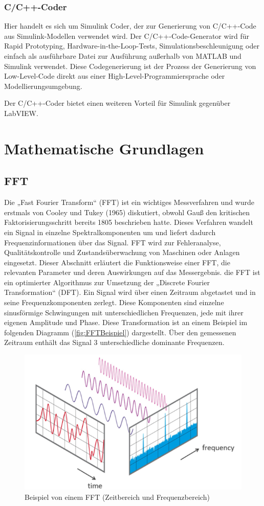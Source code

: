 \subsubsection{C/C++-Coder}
Hier handelt es sich um Simulink Coder, der zur Generierung von C/C++-Code aus Simulink-Modellen verwendet wird. Der C/C++-Code-Generator wird für Rapid Prototyping, Hardware-in-the-Loop-Tests, Simulationsbeschleunigung oder einfach als ausführbare Datei zur Ausführung außerhalb von MATLAB und Simulink verwendet.
Diese Codegenerierung ist der Prozess der Generierung von Low-Level-Code direkt aus einer High-Level-Programmiersprache oder Modellierungsumgebung.

Der C/C++-Coder bietet einen weiteren Vorteil für Simulink gegenüber LabVIEW.
\section{Mathematische Grundlagen}

\subsection{FFT}
\cite{NTIAudioFFT}\cite{WeissteinFFT}

Die „Fast Fourier Transform“ (FFT) ist ein wichtiges Messverfahren und wurde erstmals von Cooley und Tukey (1965) diskutiert, obwohl Gauß den kritischen Faktorisierungsschritt bereits 1805 beschrieben hatte. Dieses Verfahren wandelt ein Signal in einzelne Spektralkomponenten um und liefert dadurch Frequenzinformationen über das Signal. FFT wird zur Fehleranalyse, Qualitätskontrolle und Zustandsüberwachung von Maschinen oder Anlagen eingesetzt. Dieser Abschnitt erläutert die Funktionsweise einer FFT, die relevanten Parameter und deren Auswirkungen auf das Messergebnis.
die FFT ist ein optimierter Algorithmus zur Umsetzung der „Discrete Fourier Transformation“ (DFT). Ein Signal wird über einen Zeitraum abgetastet und in seine Frequenzkomponenten zerlegt. Diese Komponenten sind einzelne sinusförmige Schwingungen mit unterschiedlichen Frequenzen, jede mit ihrer eigenen Amplitude und Phase. Diese Transformation ist an einem Beispiel im folgenden Diagramm (\autoref{fig:FFTBeispiel}) dargestellt. Über den gemessenen Zeitraum enthält das Signal 3 unterschiedliche dominante Frequenzen.\\
\begin{figure}[H]
	\centering
	\includegraphics[width=0.5\linewidth]{Bilder/FFTBeispiel.png}
	\caption{Beispiel von einem FFT (Zeitbereich und Frequenzbereich)\cite{NTIAudioFFT}}
	\label{fig:FFTBeispiel}
\end{figure}

